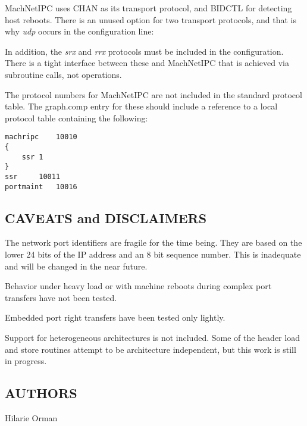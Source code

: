 MachNetIPC uses CHAN as its transport protocol, and BIDCTL for detecting
host reboots.  There is an unused option for two transport protocols, and
that is why {\em udp } occurs in the configuration line:


In addition, the {\em srx} and {\em rrx} protocols must be included in
the configuration.  There is a tight interface between these and MachNetIPC
that is achieved via subroutine calls, not \xk{} operations.

The protocol numbers for MachNetIPC are not included in the standard
protocol table.  The graph.comp entry for these should include a
reference to a local protocol table containing the following:

\begin{verbatim}
machripc	10010
{
	ssr	1
}	
ssr		10011
portmaint	10016
\end{verbatim}

\subsection*{CAVEATS and DISCLAIMERS}

The network port identifiers are fragile for the time
being.  They are based on the lower 24 bits of the IP address
and an 8 bit sequence number.  This is inadequate and will be
changed in the near future.

Behavior under heavy load or with machine reboots during complex
port transfers have not been tested.

Embedded port right transfers have been tested only lightly.

Support for heterogeneous architectures is not included.  Some
of the header load and store routines attempt to be architecture
independent, but this work is still in progress.

\subsection*{AUTHORS}

\noindent Hilarie Orman
